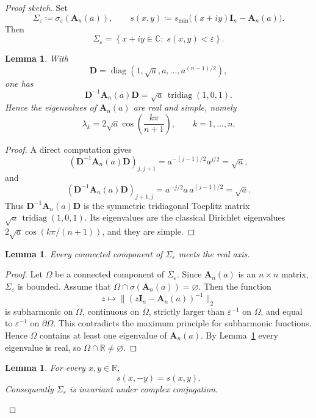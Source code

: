 \documentclass[11pt]{article}
\newtheorem{lemma}[theorem]{Lemma}
\begin{document}
\begin{proof}[Proof sketch]
Set
\[
\Sigma_\varepsilon
\coloneqq
\sigma_\varepsilon(\mathbf A_n(a)),
\qquad
s(x,y)
\coloneqq
s_{\min}\!\bigl((x+iy)\mathbf I_n-\mathbf A_n(a)\bigr).
\]
Then
\[
\Sigma_\varepsilon
=
\left\{
x+iy\in\mathbb C:\; s(x,y)<\varepsilon
\right\}.
\]

\begin{lemma}\label{lem:real-spectrum}
With
\[
\mathbf D=\operatorname{diag}(1,\sqrt a,a,\dots,a^{(n-1)/2}),
\]
one has
\[
\mathbf D^{-1}\mathbf A_n(a)\mathbf D
=
\sqrt a\,\operatorname{tridiag}(1,0,1).
\]
Hence the eigenvalues of \(\mathbf A_n(a)\) are real and simple, namely
\[
\lambda_k
=
2\sqrt a\cos\!\left(\frac{k\pi}{n+1}\right),
\qquad
k=1,\dots,n.
\]
\end{lemma}

\begin{proof}
A direct computation gives
\[
(\mathbf D^{-1}\mathbf A_n(a)\mathbf D)_{j,j+1}
=
a^{-(j-1)/2}a^{j/2}
=
\sqrt a,
\]
and
\[
(\mathbf D^{-1}\mathbf A_n(a)\mathbf D)_{j+1,j}
=
a^{-j/2}a\,a^{(j-1)/2}
=
\sqrt a.
\]
Thus \(\mathbf D^{-1}\mathbf A_n(a)\mathbf D\) is the symmetric tridiagonal Toeplitz
matrix \(\sqrt a\,\operatorname{tridiag}(1,0,1)\). Its eigenvalues are the classical Dirichlet
eigenvalues \(2\sqrt a\cos(k\pi/(n+1))\), and they are simple.
\end{proof}

\begin{lemma}\label{lem:real-axis}
Every connected component of \(\Sigma_\varepsilon\) meets the real axis.
\end{lemma}

\begin{proof}
Let \(\Omega\) be a connected component of \(\Sigma_\varepsilon\).
Since \(\mathbf A_n(a)\) is an \(n\times n\) matrix, \(\Sigma_\varepsilon\) is bounded.
Assume that \(\Omega\cap\sigma(\mathbf A_n(a))=\varnothing\).
Then the function
\[
z\longmapsto \|(z\mathbf I_n-\mathbf A_n(a))^{-1}\|_2
\]
is subharmonic on \(\Omega\), continuous on \(\overline{\Omega}\), strictly larger than
\(\varepsilon^{-1}\) on \(\Omega\), and equal to \(\varepsilon^{-1}\) on \(\partial\Omega\).
This contradicts the maximum principle for subharmonic functions.
Hence \(\Omega\) contains at least one eigenvalue of \(\mathbf A_n(a)\).
By Lemma~\ref{lem:real-spectrum} every eigenvalue is real, so
\(\Omega\cap\mathbb R\neq\varnothing\).
\end{proof}

\begin{lemma}\label{lem:conjugation-symmetry}
For every \(x,y\in\mathbb R\),
\[
s(x,-y)=s(x,y).
\]
Consequently \(\Sigma_\varepsilon\) is invariant under complex conjugation.
\end{lemma}


\end{proof}
\end{document}
